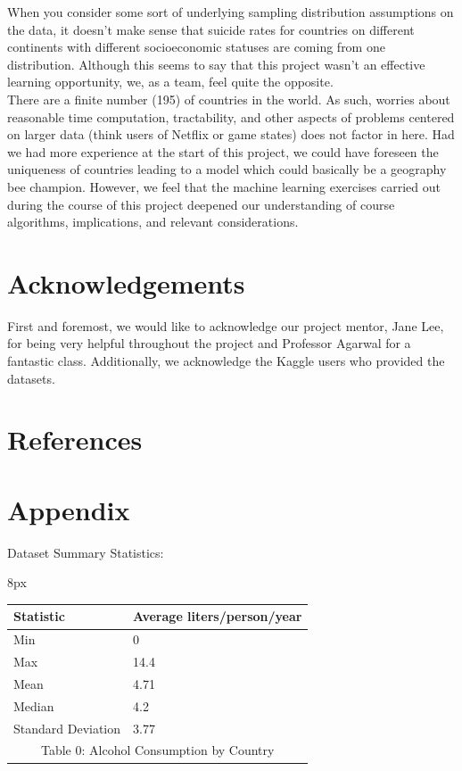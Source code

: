 \documentclass{article}
\begin{document}
\begin{multicols}{2}
When you consider some sort of underlying sampling distribution assumptions on the data, it doesn't make sense that suicide rates for countries on different continents with different socioeconomic statuses are coming from one distribution. Although this seems to say that this project wasn't an effective learning opportunity, we, as a team, feel quite the opposite. \\
There are a finite number (195) of countries in the world. As such, worries about reasonable time computation, tractability, and other aspects of problems centered on larger data (think users of Netflix or game states) does not factor in here. Had we had more experience at the start of this project, we could have foreseen the uniqueness of countries leading to a model which could basically be a geography bee champion. However, we feel that the machine learning exercises carried out during the course of this project deepened our understanding of course algorithms, implications, and relevant considerations.

\section{Acknowledgements} First and foremost, we would like to acknowledge our project mentor, Jane Lee, for being very helpful throughout the project and Professor Agarwal for a fantastic class. Additionally, we acknowledge the Kaggle users who provided the datasets.

\end{multicols}

\pagebreak

\section{References} \theendnotes

\section{Appendix}

Dataset Summary Statistics:

\begin{adjustwidth}{8px}{}
\centering
\begin{tabular}{|l|l|}
\hline
Statistic          & Average liters/person/year \\ \hline
Min                & 0                          \\ \hline
Max                & 14.4                       \\ \hline
Mean               & 4.71                       \\ \hline
Median             & 4.2                        \\ \hline
Standard Deviation & 3.77                       \\ \hline
\multicolumn{2}{c}{Table 0: Alcohol Consumption by Country} 
\label{summary-statistic-table-alcohol}
\end{tabular}
\end{adjustwidth}
\end{document}
